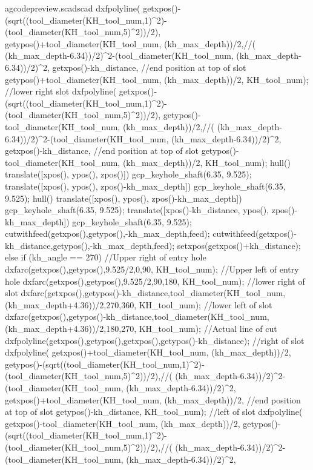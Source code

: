 \documentclass{ltxdoc}
\begin{document}
\begin{writecode}{a}{gcodepreview.scad}{scad}
{    dxfpolyline(
        getxpos()-(sqrt((tool_diameter(KH_tool_num,1)^2)-(tool_diameter(KH_tool_num,5)^2))/2), 
        getypos()+tool_diameter(KH_tool_num, (kh_max_depth))/2,//( (kh_max_depth-6.34))/2)^2-(tool_diameter(KH_tool_num, (kh_max_depth-6.34))/2)^2,
        getxpos()-kh_distance,
    //end position at top of slot
        getypos()+tool_diameter(KH_tool_num, (kh_max_depth))/2, 
        KH_tool_num);
    //lower right slot
    dxfpolyline(
        getxpos()-(sqrt((tool_diameter(KH_tool_num,1)^2)-(tool_diameter(KH_tool_num,5)^2))/2), 
        getypos()-tool_diameter(KH_tool_num, (kh_max_depth))/2,//( (kh_max_depth-6.34))/2)^2-(tool_diameter(KH_tool_num, (kh_max_depth-6.34))/2)^2,
        getxpos()-kh_distance,
    //end position at top of slot
        getypos()-tool_diameter(KH_tool_num, (kh_max_depth))/2, 
        KH_tool_num);
    hull(){
      translate([xpos(), ypos(), zpos()]){
        gcp_keyhole_shaft(6.35, 9.525);
      }
      translate([xpos(), ypos(), zpos()-kh_max_depth]){
        gcp_keyhole_shaft(6.35, 9.525);
      }
    }
    hull(){
      translate([xpos(), ypos(), zpos()-kh_max_depth]){
        gcp_keyhole_shaft(6.35, 9.525);
      }
      translate([xpos()-kh_distance, ypos(), zpos()-kh_max_depth]){
        gcp_keyhole_shaft(6.35, 9.525);
      }
    }
    cutwithfeed(getxpos(),getypos(),-kh_max_depth,feed);
    cutwithfeed(getxpos()-kh_distance,getypos(),-kh_max_depth,feed);
    setxpos(getxpos()+kh_distance);
  } else if (kh_angle == 270) {
    //Upper right of entry hole
    dxfarc(getxpos(),getypos(),9.525/2,0,90, KH_tool_num);
    //Upper left of entry hole
    dxfarc(getxpos(),getypos(),9.525/2,90,180, KH_tool_num);
    //lower right of slot
    dxfarc(getxpos(),getypos()-kh_distance,tool_diameter(KH_tool_num, (kh_max_depth+4.36))/2,270,360, KH_tool_num);
    //lower left of slot
    dxfarc(getxpos(),getypos()-kh_distance,tool_diameter(KH_tool_num, (kh_max_depth+4.36))/2,180,270, KH_tool_num);
    //Actual line of cut
    dxfpolyline(getxpos(),getypos(),getxpos(),getypos()-kh_distance);
    //right of slot
    dxfpolyline(
        getxpos()+tool_diameter(KH_tool_num, (kh_max_depth))/2, 
        getypos()-(sqrt((tool_diameter(KH_tool_num,1)^2)-(tool_diameter(KH_tool_num,5)^2))/2),//( (kh_max_depth-6.34))/2)^2-(tool_diameter(KH_tool_num, (kh_max_depth-6.34))/2)^2,
        getxpos()+tool_diameter(KH_tool_num, (kh_max_depth))/2,
    //end position at top of slot
        getypos()-kh_distance, 
        KH_tool_num);
    //left of slot
    dxfpolyline(
        getxpos()-tool_diameter(KH_tool_num, (kh_max_depth))/2, 
        getypos()-(sqrt((tool_diameter(KH_tool_num,1)^2)-(tool_diameter(KH_tool_num,5)^2))/2),//( (kh_max_depth-6.34))/2)^2-(tool_diameter(KH_tool_num, (kh_max_depth-6.34))/2)^2,
}
\end{writecode}
\end{document}
